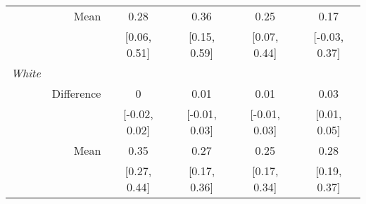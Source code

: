 \begin{table}[ht]
\begin{tabular}{lrcccc}
   & Mean & 0.28 & 0.36 & 0.25 & 0.17 \\ 
   &  & [0.06, 0.51] & [0.15, 0.59] & [0.07, 0.44] & [-0.03, 0.37] \\ 
  {\textit{White}} &  &  &  &  &  \\ 
   & Difference & 0 & 0.01 & 0.01 & 0.03 \\ 
   &  & [-0.02, 0.02] & [-0.01, 0.03] & [-0.01, 0.03] & [0.01, 0.05] \\ 
   & Mean & 0.35 & 0.27 & 0.25 & 0.28 \\ 
   &  & [0.27, 0.44] & [0.17, 0.36] & [0.17, 0.34] & [0.19, 0.37] \\ 
   \hline
\end{tabular}
\end{table}

